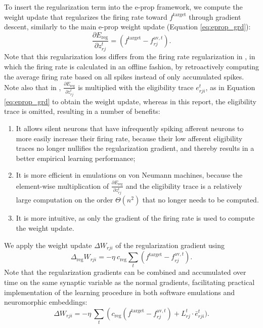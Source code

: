 		To insert the regularization term into the e-prop framework, we compute the weight update that regularizes the firing rate toward $f^\text{target}$ through gradient descent, similarly to the main e-prop weight update (Equation \ref{eq:eprop_grd}):
		\begin{equation}
		\frac{\partial E_\text{reg}}{\partial z_{rj}^t} = \left(f^\text{target} - f^{\text{av}, t}_{rj}\right).
		\end{equation}
		Note that this regularization loss differs from the firing rate regularization in \cite{bellec2020solution}, in which the firing rate is calculated in an offline fashion, by retroactively computing the average firing rate based on all spikes instead of only accumulated spikes.
		Note also that in \cite{bellec2020solution}, $\frac{\partial E_\text{reg}}{\partial z_{rj}^t}$ is multiplied with the eligibility trace $e^t_{rji}$, as in Equation \ref{eq:eprop_grd} to obtain the weight update, whereas in this report, the eligibility trace is omitted, resulting in a number of benefits:
		\begin{enumerate}
			\item It allows silent neurons that have infrequently spiking afferent neurons to more easily increase their firing rate, because their low afferent eligibility traces no longer nullifies the regularization gradient, and thereby results in a better empirical learning performance;
			\item It is more efficient in emulations on von Neumann machines, because the element-wise multiplication of $\frac{\partial E_\text{reg}}{\partial z_{rj}^t}$ and the eligibility trace is a relatively large computation on the order $\Theta\!\left(n^2\right)$ that no longer needs to be computed.
			\item It is more intuitive, as only the gradient of the firing rate is used to compute the weight update.
		\end{enumerate}
		We apply the weight update $\Delta W_{rji}$ of the regularization gradient using
		\begin{equation}
		\Delta_\text{reg} W_{rji} = -\eta\ c_\text{reg}\sum_t\left(f^\text{target} - f^{\text{av}, t}_{rj}\right).
		\end{equation}
		Note that the regularization gradients can be combined and accumulated over time on the same synaptic variable as the normal gradients, facilitating practical implementation of the learning procedure in both software emulations and neuromorphic embeddings:
		\begin{equation}
		\Delta W_{rji} = -\eta\ \sum_t\left(c_\text{reg}\left(f^\text{target} - f^{\text{av}, t}_{rj}\right) + L^t_{rj}\cdot\bar{e}^t_{rji}).
		\end{equation}


